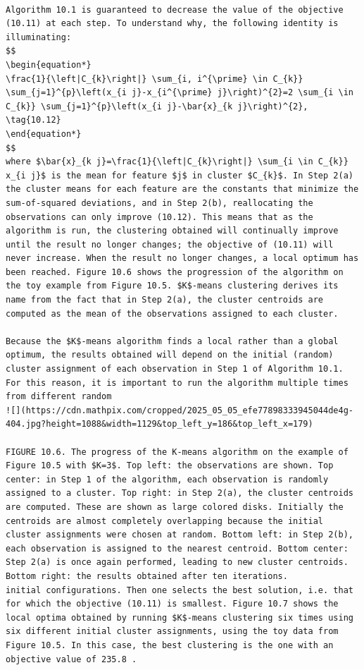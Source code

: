 \documentclass[10pt]{article}
\begin{document}
\begin{verbatim}

Algorithm 10.1 is guaranteed to decrease the value of the objective (10.11) at each step. To understand why, the following identity is illuminating:
$$
\begin{equation*}
\frac{1}{\left|C_{k}\right|} \sum_{i, i^{\prime} \in C_{k}} \sum_{j=1}^{p}\left(x_{i j}-x_{i^{\prime} j}\right)^{2}=2 \sum_{i \in C_{k}} \sum_{j=1}^{p}\left(x_{i j}-\bar{x}_{k j}\right)^{2}, \tag{10.12}
\end{equation*}
$$
where $\bar{x}_{k j}=\frac{1}{\left|C_{k}\right|} \sum_{i \in C_{k}} x_{i j}$ is the mean for feature $j$ in cluster $C_{k}$. In Step 2(a) the cluster means for each feature are the constants that minimize the sum-of-squared deviations, and in Step 2(b), reallocating the observations can only improve (10.12). This means that as the algorithm is run, the clustering obtained will continually improve until the result no longer changes; the objective of (10.11) will never increase. When the result no longer changes, a local optimum has been reached. Figure 10.6 shows the progression of the algorithm on the toy example from Figure 10.5. $K$-means clustering derives its name from the fact that in Step 2(a), the cluster centroids are computed as the mean of the observations assigned to each cluster.

Because the $K$-means algorithm finds a local rather than a global optimum, the results obtained will depend on the initial (random) cluster assignment of each observation in Step 1 of Algorithm 10.1. For this reason, it is important to run the algorithm multiple times from different random
![](https://cdn.mathpix.com/cropped/2025_05_05_efe77898333945044de4g-404.jpg?height=1088&width=1129&top_left_y=186&top_left_x=179)

FIGURE 10.6. The progress of the K-means algorithm on the example of Figure 10.5 with $K=3$. Top left: the observations are shown. Top center: in Step 1 of the algorithm, each observation is randomly assigned to a cluster. Top right: in Step 2(a), the cluster centroids are computed. These are shown as large colored disks. Initially the centroids are almost completely overlapping because the initial cluster assignments were chosen at random. Bottom left: in Step 2(b), each observation is assigned to the nearest centroid. Bottom center: Step 2(a) is once again performed, leading to new cluster centroids. Bottom right: the results obtained after ten iterations.
initial configurations. Then one selects the best solution, i.e. that for which the objective (10.11) is smallest. Figure 10.7 shows the local optima obtained by running $K$-means clustering six times using six different initial cluster assignments, using the toy data from Figure 10.5. In this case, the best clustering is the one with an objective value of 235.8 .


\end{verbatim}
\end{document}
